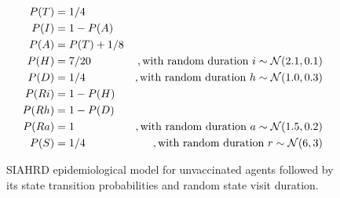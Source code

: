 \begin{figure}
    \begin{minipage}{\textwidth}
        \centering
    \end{minipage}

    \begin{minipage}{\textwidth}
        \begin{align*}
            P(T) &= 1/4 \\
            P(I) &= 1 - P(A) \\
            P(A) &= P(T) + 1/8 \\
            P(H) &= 7/20&, \textnormal{with random duration } i \sim \mathcal{N}(2.1, 0.1) \\
            P(D) &= 1/4&, \textnormal{with random duration } h \sim \mathcal{N}(1.0, 0.3) \\
            P(Ri) &= 1 - P(H) \\
            P(Rh) &= 1 - P(D) \\
            P(Ra) &= 1&, \textnormal{with random duration } a \sim \mathcal{N}(1.5, 0.2) \\
            P(S) &= 1/4&, \textnormal{with random duration } r \sim \mathcal{N}(6, 3)
        \end{align*}
    \end{minipage}
    \caption{SIAHRD epidemiological model for unvaccinated agents followed by its state transition probabilities and random state visit duration.
    \label{fig:epidemiological_model}}
\end{figure}

